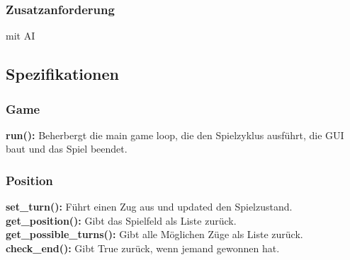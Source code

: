 \documentclass{article}
\begin{document}
\subsubsection{Zusatzanforderung}
mit AI
\begin{figure}[h]
    \centering
\end{figure}

\newpage

\subsection{Spezifikationen}

\subsubsection{Game}

\textbf{run():} Beherbergt die main game loop, die den Spielzyklus ausführt, die GUI baut und das Spiel beendet.

\subsubsection{Position}

\textbf{set\_turn():} Führt einen Zug aus und updated den Spielzustand. \\
\textbf{get\_position():} Gibt das Spielfeld als Liste zurück. \\
\textbf{get\_possible\_turns():} Gibt alle Möglichen Züge als Liste zurück. \\
\textbf{check\_end():} Gibt True zurück, wenn jemand gewonnen hat. \\
\end{document}
